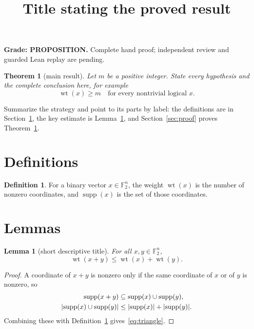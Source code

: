 \documentclass{article}
\title{Title stating the proved result}
\author{}
\date{}
\theoremstyle{plain}
\newtheorem{theorem}{Theorem}
\newtheorem{lemma}{Lemma}
\theoremstyle{definition}
\newtheorem{definition}{Definition}
\theoremstyle{remark}
\DeclareMathOperator{\wt}{wt}
\DeclareMathOperator{\supp}{supp}
\DeclarePairedDelimiter{\abs}{\lvert}{\rvert}
\newcommand{\Ftwo}{\mathbb{F}_2}
\begin{document}
\maketitle

\textbf{Grade: PROPOSITION.} Complete hand proof; independent review and
guarded Lean replay are pending.

\begin{theorem}[main result]\label{thm:main}
  Let \(m\) be a positive integer. State every hypothesis and the complete
  conclusion here, for example
  \begin{equation}\label{eq:main-bound}
    \wt(x)\ge m \quad\text{for every nontrivial logical } x.
  \end{equation}
\end{theorem}

Summarize the strategy and point to its parts by label: the definitions are
in Section~\ref{sec:definitions}, the key estimate is
Lemma~\ref{lem:example}, and Section~\ref{sec:proof} proves
Theorem~\ref{thm:main}.

\section{Definitions}\label{sec:definitions}

\begin{definition}\label{def:weight}
  For a binary vector \(x\in\Ftwo^n\), the weight \(\wt(x)\) is the number
  of nonzero coordinates, and \(\supp(x)\) is the set of those coordinates.
\end{definition}

\section{Lemmas}\label{sec:lemmas}

\begin{lemma}[short descriptive title]\label{lem:example}
  For all \(x,y\in\Ftwo^n\),
  \begin{equation}\label{eq:triangle}
    \wt(x+y)\le\wt(x)+\wt(y).
  \end{equation}
\end{lemma}

\begin{proof}
  A coordinate of \(x+y\) is nonzero only if the same coordinate of \(x\) or
  of \(y\) is nonzero, so
  \begin{align}
    \supp(x+y)&\subseteq\supp(x)\cup\supp(y),\label{eq:support}\\
    \abs{\supp(x)\cup\supp(y)}&\le\abs{\supp(x)}+\abs{\supp(y)}.
  \end{align}
  Combining these with Definition~\ref{def:weight} gives~\eqref{eq:triangle}.
\end{proof}
\end{document}
